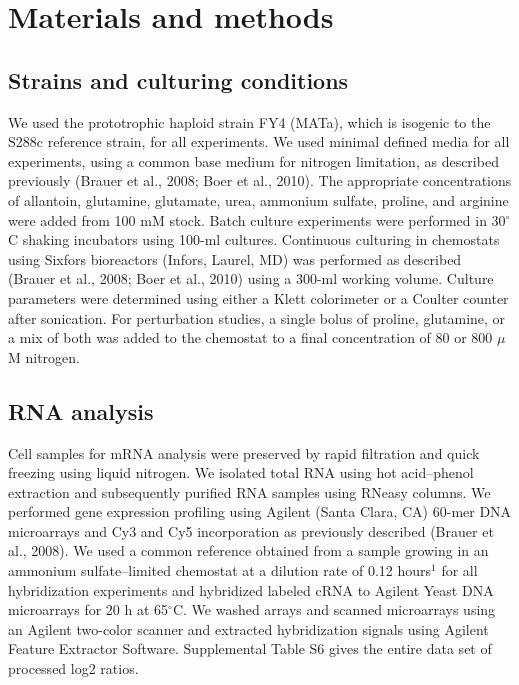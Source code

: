\section{Materials and methods}

\subsection{Strains and culturing conditions}

We used the prototrophic haploid strain FY4 (MATa), which
is isogenic to the S288c reference strain, for all experiments. We
used minimal defined media for all experiments, using a common base
medium for nitrogen limitation, as described previously (Brauer et
al., 2008; Boer et al., 2010). The appropriate concentrations of
allantoin, glutamine, glutamate, urea, ammonium sulfate, proline, and
arginine were added from 100 mM stock. Batch culture experiments were
performed in 30$^{\circ}$C shaking incubators using 100-ml cultures. Continuous
culturing in chemostats using Sixfors bioreactors (Infors, Laurel, MD)
was performed as described (Brauer et al., 2008; Boer et al., 2010)
using a 300-ml working volume. Culture parameters were determined
using either a Klett colorimeter or a Coulter counter after
sonication. For perturbation studies, a single bolus of proline,
glutamine, or a mix of both was added to the chemostat to a final
concentration of 80 or 800 $\mu$M nitrogen.  

\subsection{RNA analysis} 

Cell samples for
mRNA analysis were preserved by rapid filtration and quick freezing
using liquid nitrogen. We isolated total RNA using hot acid–phenol
extraction and subsequently purified RNA samples using RNeasy columns.
We performed gene expression profiling using Agilent (Santa Clara, CA)
60-mer DNA microarrays and Cy3 and Cy5 incorporation as previously
described (Brauer et al., 2008). We used a common reference obtained
from a sample growing in an ammonium sulfate–limited chemostat at a
dilution rate of 0.12 hours$^1$ for all hybridization experiments and
hybridized labeled cRNA to Agilent Yeast DNA microarrays for 20 h at
65$^{\circ}$C. We washed arrays and scanned microarrays using an Agilent
two-color scanner and extracted hybridization signals using Agilent
Feature Extractor Software. Supplemental Table S6 gives the entire
data set of processed log2 ratios.  


